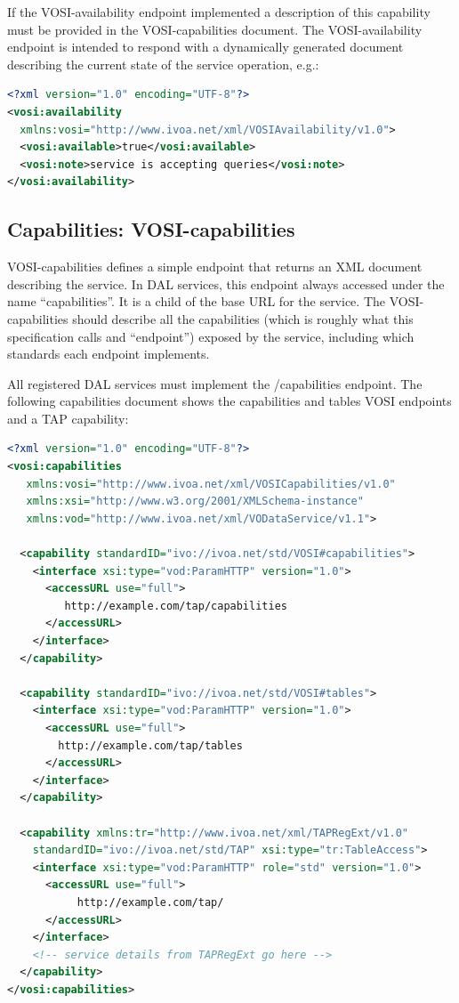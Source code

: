 \documentclass[11pt,letter]{ivoa}
\begin{document}
If the VOSI-availability endpoint implemented a description
of this capability must be provided in the VOSI-capabilities document.
The VOSI-availability endpoint is
intended to respond with a dynamically generated document describing the current state of the service
operation, e.g.:

\begin{lstlisting}[language=XML,basicstyle=\footnotesize]
<?xml version="1.0" encoding="UTF-8"?>
<vosi:availability
  xmlns:vosi="http://www.ivoa.net/xml/VOSIAvailability/v1.0">
  <vosi:available>true</vosi:available>
  <vosi:note>service is accepting queries</vosi:note>
</vosi:availability>
\end{lstlisting}

\subsection{Capabilities: VOSI-capabilities}
\label{sec:vosi-capabilities}
VOSI-capabilities \citep{2017ivoa.spec.0524G} defines a simple endpoint that
returns an XML document
describing the service. In  DAL services, this endpoint always accessed
under the name
``capabilities''.  It is a child of the base URL for the service. The
VOSI-capabilities should describe all the capabilities (which is roughly
what this specification calls and ``endpoint'') exposed by the service,
including which standards each endpoint implements.

All registered DAL services must implement the /capabilities endpoint. The following
capabilities document shows the capabilities and tables VOSI endpoints
and a TAP capability:

\begin{lstlisting}[language=XML,basicstyle=\footnotesize]
<?xml version="1.0" encoding="UTF-8"?>
<vosi:capabilities
   xmlns:vosi="http://www.ivoa.net/xml/VOSICapabilities/v1.0"
   xmlns:xsi="http://www.w3.org/2001/XMLSchema-instance"
   xmlns:vod="http://www.ivoa.net/xml/VODataService/v1.1">

  <capability standardID="ivo://ivoa.net/std/VOSI#capabilities">
    <interface xsi:type="vod:ParamHTTP" version="1.0">
      <accessURL use="full">
         http://example.com/tap/capabilities
      </accessURL>
    </interface>
  </capability>

  <capability standardID="ivo://ivoa.net/std/VOSI#tables">
    <interface xsi:type="vod:ParamHTTP" version="1.0">
      <accessURL use="full">
        http://example.com/tap/tables
      </accessURL>
    </interface>
  </capability>

  <capability xmlns:tr="http://www.ivoa.net/xml/TAPRegExt/v1.0"
    standardID="ivo://ivoa.net/std/TAP" xsi:type="tr:TableAccess">
    <interface xsi:type="vod:ParamHTTP" role="std" version="1.0">
      <accessURL use="full">
           http://example.com/tap/
      </accessURL>
    </interface>
    <!-- service details from TAPRegExt go here -->
  </capability>
</vosi:capabilities>
\end{lstlisting}
\end{document}
